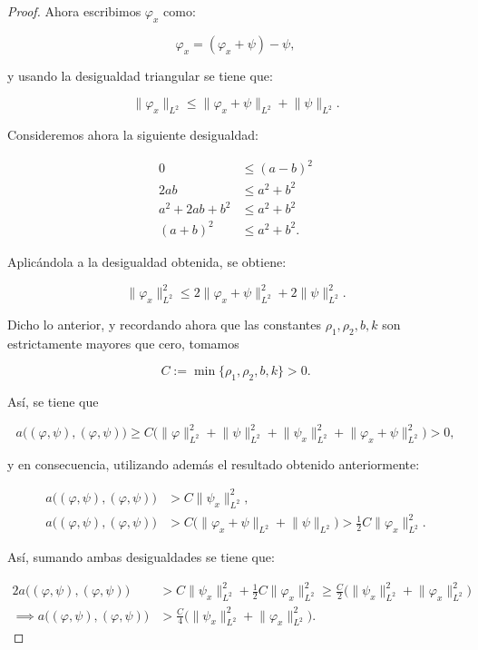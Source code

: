 \begin{proof}
    Ahora escribimos $\varphi_x$ como:

    \[\varphi_x = (\varphi_x + \psi) - \psi,\]

    y usando la desigualdad triangular se tiene que:

    \[\lVert \varphi_x \rVert_{L^2} \leq \lVert \varphi_x + \psi \rVert_{L^2} + \lVert \psi \rVert_{L^2}.\]

    Consideremos ahora la siguiente desigualdad:

    \begin{align*}
        0 &\leq (a - b)^2\\
        2ab &\leq a^2 + b^2\\
        a^2 + 2ab + b^2 &\leq a^2 + b^2\\
        (a+b)^2 &\leq a^2 + b^2.
    \end{align*}

    Aplicándola a la desigualdad obtenida, se obtiene:

    \[\lVert \varphi_x \rVert^2_{L^2} \leq 2\lVert \varphi_x + \psi \rVert^2_{L^2} + 2\lVert \psi \rVert^2_{L^2}.\]

    Dicho lo anterior, y recordando ahora que las constantes $\rho_1, \rho_2, b, k$ son estrictamente mayores que cero, tomamos

    \[C := \min \{\rho_1, \rho_2, b, k\} > 0.\]

    Así, se tiene que

    \[a\big((\varphi, \psi), (\varphi, \psi)\big) \geq C \big( \lVert \varphi \rVert^2_{L^2} + \lVert \psi \rVert_{L^2}^2 + \lVert \psi_x \rVert^2_{L^2} + \lVert \varphi_x + \psi \rVert_{L^2}^2 \big) > 0,\]

    y en consecuencia, utilizando además el resultado obtenido anteriormente:

    \begin{align*}
        a\big((\varphi, \psi), (\varphi, \psi)\big) &> C \lVert \psi_x \rVert^2_{L^2},\\
        a\big((\varphi, \psi), (\varphi, \psi)\big) &> C\big(\lVert \varphi_x + \psi \rVert_{L^2} + \lVert \psi \rVert_{L^2} \big) > \frac{1}{2}C \lVert \varphi_x \rVert^2_{L^2}.
    \end{align*}

    Así, sumando ambas desigualdades se tiene que:

    \begin{align*}
        2a\big((\varphi, \psi), (\varphi, \psi)\big) &> C \lVert \psi_x \rVert^2_{L^2} + \frac{1}{2}C \lVert \varphi_x \rVert^2_{L^2} \geq \frac{C}{2}\big( \lVert \psi_x \rVert^2_{L^2} + \lVert \varphi_x \rVert^2_{L^2} \big)\\
        \implies a\big((\varphi, \psi), (\varphi, \psi)\big) &>\frac{C}{4}\big( \lVert \psi_x \rVert^2_{L^2} + \lVert \varphi_x \rVert^2_{L^2} \big).
    \end{align*}


\end{proof}
